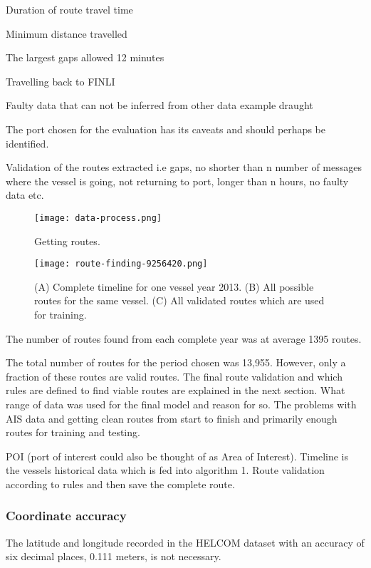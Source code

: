 \documentclass[../main.tex]{subfiles}
\begin{document}
Duration of route travel time 

Minimum distance travelled

The largest gaps allowed 12 minutes

Travelling back to FINLI

Faulty data that can not be inferred from other data example draught

The port chosen for the evaluation has its caveats and should perhaps be identified.

Validation of the routes extracted i.e gaps, no shorter than n number of messages where the vessel is going, not returning to port, longer than n hours, no faulty data etc.

\begin{figure}[H]
	\centering
	\texttt{[image: data-process.png]}
	\caption{Getting routes.}
	\label{fig:flowchart}
\end{figure}

\begin{figure}[H]
	\centering
	\texttt{[image: route-finding-9256420.png]}
	\caption{(A) Complete timeline for one vessel year 2013. (B) All possible routes for the same vessel. (C) All validated routes which are used for training. }
	\label{fig:route-finding}
\end{figure}

The number of routes found from each complete year was at average 1395 routes. 

The total number of routes for the period chosen was 13,955. However, only a fraction of these routes are valid routes. The final route validation and which rules are defined to find viable routes are explained in the next section.
What range of data was used for the final model and reason for so. The problems with AIS data and getting clean routes from start to finish and primarily enough routes for training and testing. 

POI (port of interest could also be thought of as Area of Interest). Timeline is the vessels historical data which is fed into algorithm 1. Route validation according to rules and then save the complete route.

\subsubsection{Coordinate accuracy}

The latitude and longitude recorded in the HELCOM dataset with an accuracy of six decimal places, 0.111 meters, is not necessary.
\end{document}
